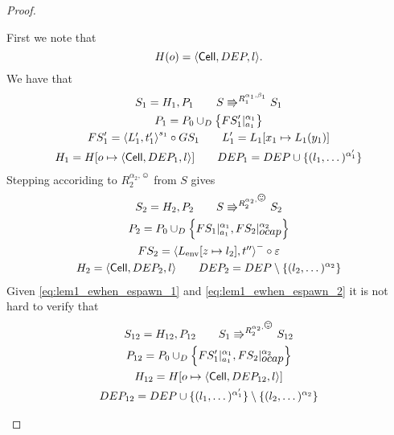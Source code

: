 \begin{proof}
\begin{description}
      First we note that
      \begin{equation}
        H(o) = \mbox{$\langle \mbox{$\mathsf{Cell}$}{}, DEP, l \rangle$}.
      \end{equation}
      We have that 
      \begin{equation} \label{eq:lem1_ewhen_espawn_1}
        \begin{gathered}    
          S_1 = H_1, P_1 \quad\quad S \Rrightarrow^{R_1^{\alpha_1, \beta_1}} S_1
          \\
          P_1 = P_0 \cup_D \left\{ FS'_1|_{a_1}^{\alpha_1} \right\} \\
          FS'_1 = \mbox{$\langle L'_1, t'_1 \rangle$}^{s_1} \circ GS_1  \quad\quad L'_1 = L_1[x_1 \mapsto
          L_1(y_1)] \\
          H_1 = H[o \mapsto \mbox{$\langle \mbox{$\mathsf{Cell}$}{}, DEP_1, l \rangle$}] \quad\quad DEP_1 = DEP \cup \{ (l_1,
          \dots)^{\alpha'_1} \}
        \end{gathered}
      \end{equation}
      Stepping accoriding to $R_2^{\alpha_2, \smiley}$ from $S$ gives
      \begin{equation} \label{eq:lem1_ewhen_espawn_2}
        \begin{gathered}
          S_2 = H_2, P_2 \andalso S \Rrightarrow^{R_2^{\alpha_2, \smiley}} S_2
          \\
          P_2 = P_0 \cup_D \left\{ FS_1|_{a_1}^{\alpha_1},
          FS_2|_{\ocap}^{\alpha_2} \right\} \\
          FS_2 = \xframe{L_{\text{env}}[z \mapsto l_2], t''}^{-} \circ
          \varepsilon \\
          H_2 = \Cell{DEP_2, l} \andalso DEP_2 = DEP \setminus \{ (l_2,
          \dots)^{\alpha_2} \}
        \end{gathered}
      \end{equation}
      Given \eqref{eq:lem1_ewhen_espawn_1} and \eqref{eq:lem1_ewhen_espawn_2} it
      is not hard to verify that
      \begin{equation} 
        \begin{gathered}
          S_{12} = H_{12}, P_{12} \andalso S_1 \Rrightarrow^{R_2^{\alpha_2,
          \smiley}} S_{12}
          \\
          P_{12} = P_0 \cup_D \left\{ FS'_1|_{a_1}^{\alpha_1},
          FS_2|_{\ocap}^{\alpha_2} \right\} \\
          H_{12} = H[o \mapsto \Cell{DEP_{12}, l}] \\ 
          DEP_{12} = DEP \cup \{ (l_1, \dots)^{\alpha'_1} \} \setminus \{ (l_2,
          \dots)^{\alpha_2} \}

\end{gathered}
\end{equation}
\end{description}
\end{proof}
